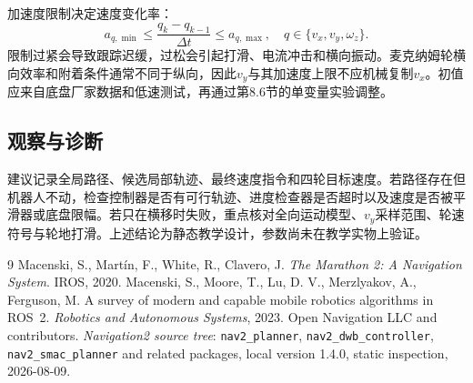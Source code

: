 \documentclass[UTF8,zihao=-4]{ctexart}
\begin{document}
加速度限制决定速度变化率：
\begin{equation}
  a_{q,\min}\le\frac{q_k-q_{k-1}}{\Delta t}\le a_{q,\max},
  \quad q\in\{v_x,v_y,\omega_z\}.
  \label{eq:body-acc-limit}
\end{equation}
限制过紧会导致跟踪迟缓，过松会引起打滑、电流冲击和横向振动。麦克纳姆轮横向效率和附着条件通常不同于纵向，因此$v_y$与其加速度上限不应机械复制$v_x$。初值应来自底盘厂家数据和低速测试，再通过第8.6节的单变量实验调整。

\subsection*{观察与诊断}

建议记录全局路径、候选局部轨迹、最终速度指令和四轮目标速度。若路径存在但机器人不动，检查控制器是否有可行轨迹、进度检查器是否超时以及速度是否被平滑器或底盘限幅。若只在横移时失败，重点核对全向运动模型、$v_y$采样范围、轮速符号与轮地打滑。上述结论为静态教学设计，参数尚未在教学实物上验证。

\begin{thebibliography}{9}
 Macenski, S., Martín, F., White, R., Clavero, J. \emph{The Marathon 2: A Navigation System}. IROS, 2020.
 Macenski, S., Moore, T., Lu, D. V., Merzlyakov, A., Ferguson, M. A survey of modern and capable mobile robotics algorithms in ROS~2. \emph{Robotics and Autonomous Systems}, 2023.
 Open Navigation LLC and contributors. \emph{Navigation2 source tree}: \texttt{nav2\_planner}, \texttt{nav2\_dwb\_controller}, \texttt{nav2\_smac\_planner} and related packages, local version 1.4.0, static inspection, 2026-08-09.
\end{thebibliography}
\end{document}
